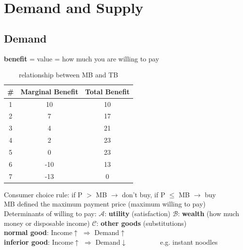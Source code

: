 \documentclass[UTF8]{article}
\begin{document}
\newpage
\section{Demand and Supply}
\subsection{Demand}
\textbf{benefit} = value = how much you are willing to pay\\

\begin{table}[!h]
    \centering
    \begin{tabular}{|c|c|c|}
        \hline
        \# & Marginal Benefit & Total Benefit \\
        \hline
        1 & 10 & 10 \\
        \hline
        2 & 7 & 17 \\
        \hline
        3 & 4 & 21\\
        \hline
        4 & 2 & 23\\
        \hline
        5 & 0 & 23\\
        \hline
        6 & -10 & 13\\
        \hline
        7 & -13 & 0\\
        \hline
    \end{tabular}
    \caption{relationship between MB and TB}
    \label{tab:my_label}
\end{table}

\noindent
Consumer choice rule: if P $>$ MB $\rightarrow$ don't buy, if P $\le$ MB $\rightarrow$ buy\\
MB defined the maximum payment price (maximum willing to pay)\\
Determinants of willing to pay: $\mathcal{A}$: \textbf{utility} (satisfaction) $\mathcal{B}$: \textbf{wealth} (how much money or disposable income) $\mathcal{C}$: \textbf{other goods} (substitutions)\\

\noindent
\textbf{normal good}: Income$\uparrow$ $\Longrightarrow$ Demand$\uparrow$ \\
\textbf{inferior good}: Income$\uparrow$ $\Longrightarrow$ Demand$\downarrow$ \ \ \ \ \ \ \ \ \ e.g. instant noodles\\
\end{document}
